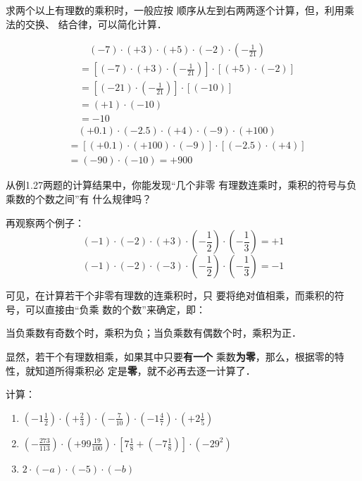 \begin{analyze}
    求两个以上有理数的乘积时，一般应按
    顺序从左到右两两逐个计算，但，利用乘法的交换、
    结合律，可以简化计算．
\end{analyze}

\begin{solution}
\begin{align*}
  &\quad   (-7) \cdot(+3) \cdot(+5) \cdot(-2) \cdot\left(-\frac{1}{21}\right)\\
  &=\left[(-7)\cdot (+3)\cdot \left(-\frac{1}{21}\right)\right]\cdot [(+5)\cdot (-2)]\tag{交换、结合律}\\
  &=\left[(-21)\cdot \left(-\frac{1}{21}\right)\right]\cdot [(-10)] \tag{异号相乘法则}\\
  &=(+1)\cdot (-10) \tag{同号相乘法则}\\
  &=-10 \tag{1的特性}
\end{align*} 
\begin{align*}
    &\quad (+0.1) \cdot(-2.5) \cdot(+4) \cdot(-9) \cdot(+100)\\
    &=[(+0.1)\cdot (+100)\cdot(-9)]\cdot[(-2.5)\cdot (+4)]\\
    &=(-90)\cdot (-10)=+900
\end{align*}    
\end{solution}

从例1.27两题的计算结果中，你能发现“几个非零
有理数连乘时，乘积的符号与负乘数的个数之间”有
什么规律吗？

再观察两个例子：
\[(-1)\cdot (-2)\cdot (+3)\cdot \left(-\frac{1}{2}\right)\cdot \left(-\frac{1}{3}\right)=+1  \]
\[(-1)\cdot (-2)\cdot (-3)\cdot \left(-\frac{1}{2}\right)\cdot \left(-\frac{1}{3}\right)=-1  \]

可见，在计算若干个非零有理数的连乘积时，只
要将绝对值相乘，而乘积的符号，可以直接由“负乘
数的个数”来确定，即：

\begin{blk}{}
    当负乘数有奇数个时，乘积为负；当负乘数有偶数个时，乘积为正．
\end{blk}
        
显然，若干个有理数相乘，如果其中只要\textbf{有一个}
乘数\textbf{为零}，那么，根据零的特性，就知道所得乘积必
定是\textbf{零}，就不必再去逐一计算了．


\begin{example}
    计算：
\begin{enumerate}
    \item $\left(-1 \frac{1}{2}\right) \cdot\left(+\frac{2}{3}\right) \cdot\left(-\frac{7}{10}\right)\cdot\left(-1 \frac{4}{7}\right) \cdot\left(+2 \frac{1}{5}\right)$
    \item $\left(-\frac{273}{113}\right) \cdot\left(+99 \frac{19}{100}\right)\cdot\left[7 \frac{1}{8}+\left(-7 \frac{1}{8}\right)\right] \cdot\left(-29^{2}\right)$
    \item $2 \cdot(-a) \cdot(-5) \cdot(-b)$
\end{enumerate}
\end{example}

